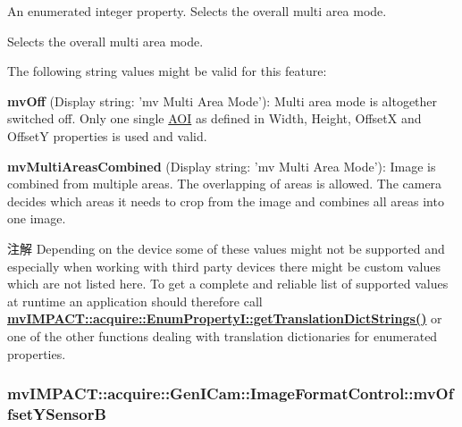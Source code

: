 An enumerated integer property. Selects the overall multi area mode. 

Selects the overall multi area mode.

The following string values might be valid for this feature\+:
\begin{DoxyItemize}
\item {\bfseries mv\+Off} (Display string\+: 'mv Multi Area Mode')\+: Multi area mode is altogether switched off. Only one single \hyperlink{struct_a_o_i}{A\+O\+I} as defined in Width, Height, Offset\+X and Offset\+Y properties is used and valid.
\item {\bfseries mv\+Multi\+Areas\+Combined} (Display string\+: 'mv Multi Area Mode')\+: Image is combined from multiple areas. The overlapping of areas is allowed. The camera decides which areas it needs to crop from the image and combines all areas into one image.
\end{DoxyItemize}

\begin{DoxyNote}{注解}
Depending on the device some of these values might not be supported and especially when working with third party devices there might be custom values which are not listed here. To get a complete and reliable list of supported values at runtime an application should therefore call {\bfseries \hyperlink{classmv_i_m_p_a_c_t_1_1acquire_1_1_enum_property_i_a0ba6ccbf5ee69784d5d0b537924d26b6}{mv\+I\+M\+P\+A\+C\+T\+::acquire\+::\+Enum\+Property\+I\+::get\+Translation\+Dict\+Strings()}} or one of the other functions dealing with translation dictionaries for enumerated properties. 
\end{DoxyNote}
\hypertarget{classmv_i_m_p_a_c_t_1_1acquire_1_1_gen_i_cam_1_1_image_format_control_a0e0b05208b8e91d1d1d70f09d7ccc9dd}{
\subsubsection[{mv\+Offset\+Y\+Sensor\+B}]{ mv\+I\+M\+P\+A\+C\+T\+::acquire\+::\+Gen\+I\+Cam\+::\+Image\+Format\+Control\+::mv\+Offset\+Y\+Sensor\+B}}\label{classmv_i_m_p_a_c_t_1_1acquire_1_1_gen_i_cam_1_1_image_format_control_a0e0b05208b8e91d1d1d70f09d7ccc9dd}


